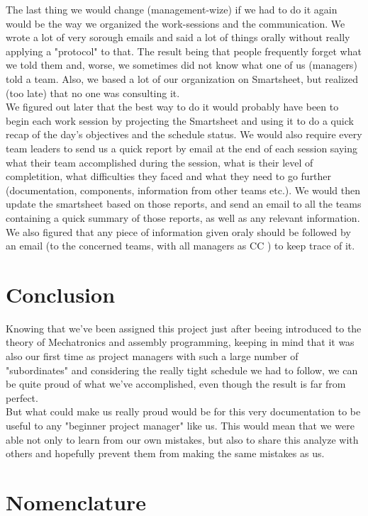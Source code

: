 \documentclass[12pt]{article}
\begin{document}
	The last thing we would change (management-wize) if we had to do it again would be the way we organized the work-sessions and the communication. We wrote a lot of very sorough emails and said a lot of things orally without really applying a "protocol" to that. The result being that people frequently forget what we told them and, worse, we sometimes did not know what one of us (managers) told a team. Also, we based a lot of our organization on Smartsheet, but realized (too late) that no one was consulting it.\\
	We figured out later that the best way to do it would probably have been to begin each work session by projecting the Smartsheet and using it to do a quick recap of the day's objectives and the schedule status. We would also require every team leaders to send us a quick report by email at the end of each session saying what their team accomplished during the session, what is their level of completition, what difficulties they faced and what they need to go further (documentation, components, information from other teams etc.). We would then update the smartsheet based on those reports, and send an email to all the teams containing a quick summary of those reports, as well as any relevant information.\\
	We also figured that any piece of information given oraly should be followed by an email (to the concerned teams, with all managers as CC ) to keep trace of it.\\


\newpage
\section{Conclusion}
	Knowing that we've been assigned this project just after beeing introduced to the theory of Mechatronics and assembly programming, keeping in mind that it was also our first time as project managers with such a large number of "subordinates" and considering the really tight schedule we had to follow, we can be quite proud of what we've accomplished, even though the result is far from perfect. \\
	But what could make us really proud would be for this very documentation to be useful to any "beginner project manager" like us. This would mean that we were able not only to learn from our own mistakes, but also to share this analyze with others and hopefully prevent them from making the same mistakes as us.


\newpage
\section{Nomenclature}
	\printnomenclature
\end{document}
